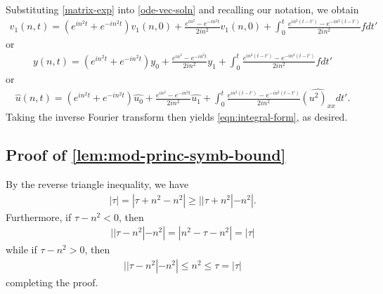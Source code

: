 \documentclass[12pt,reqno]{amsart}
\numberwithin{equation}{section}  %
\numberwithin{figure}{section}
\newcommand{\wh}{\widehat}
\theoremstyle{plain}
\theoremstyle{definition}
\theoremstyle{remark}
\begin{document}
%
%
Substituting \eqref{matrix-exp} into \eqref{ode-vec-soln} and recalling our notation, we obtain
%
%
\begin{equation*}
\begin{split}
  v_{1}(n, t) = (e^{in^{2}t} + e^{-in^{2}t})v_{1}(n, 0) + \frac{e^{in^{2}} -
  e^{-in^{2}t}}{2 i n^{2}} v_{1}(n, 0) + \int_{0}^{t} \frac{e^{in^{2}(t - t')} -
  e^{-in^{2}(t-t')}}{2 i n^{2}} f dt'
\end{split}
\end{equation*}
%
%
or
\begin{equation*}
\begin{split}
  y(n, t) = (e^{in^{2}t} + e^{-in^{2}t})y_{0} + \frac{e^{in^{2}} -
  e^{-in^{2}t}}{2 i n^{2}} y_{1} + \int_{0}^{t} \frac{e^{in^{2}(t - t')} -
  e^{-in^{2}(t-t')}}{2 i n^{2}} f dt'
\end{split}
\end{equation*}
or
\begin{equation*}
\begin{split}
  \wh{u}(n, t) = (e^{in^{2}t} + e^{-in^{2}t})\wh{u_0} + \frac{e^{in^{2}} -
  e^{-in^{2}t}}{2 i n^{2}} \wh{u_1} + \int_{0}^{t} \frac{e^{in^{2}(t - t')} -
  e^{-in^{2}(t-t')}}{2 i n^{2}} \wh{(u^{2})_{xx}} dt'.
\end{split}
\end{equation*}
%
Taking the inverse Fourier transform then yields \eqref{eqn:integral-form}, as
desired.
%
%
\subsection{Proof of \autoref{lem:mod-princ-symb-bound}} 
\label{ssec:pf-mod-princ}
By the reverse triangle inequality, we have
%
%
\begin{equation*}
\begin{split}
  | \tau | = | \tau + n^{2} - n^{2} | \ge | | \tau + n^{2} | - n^{2} |.
\end{split}
\end{equation*}
%
%
Furthermore, if $\tau - n^{2} < 0$, then
%
%
\begin{equation*}
\begin{split}
  | | \tau - n^{2} | - n^{2} | = | n^{2} - \tau - n^{2} | = | \tau |
\end{split}
\end{equation*}
%
%
while if $\tau - n^{2} > 0$, then
%
%
\begin{equation*}
\begin{split}
  | | \tau - n^{2} | - n^{2} | \le n^{2} \le \tau = |\tau|
\end{split}
\end{equation*}
%
%
completing the proof. \qquad \qedsymbol
%
%
\end{document}
